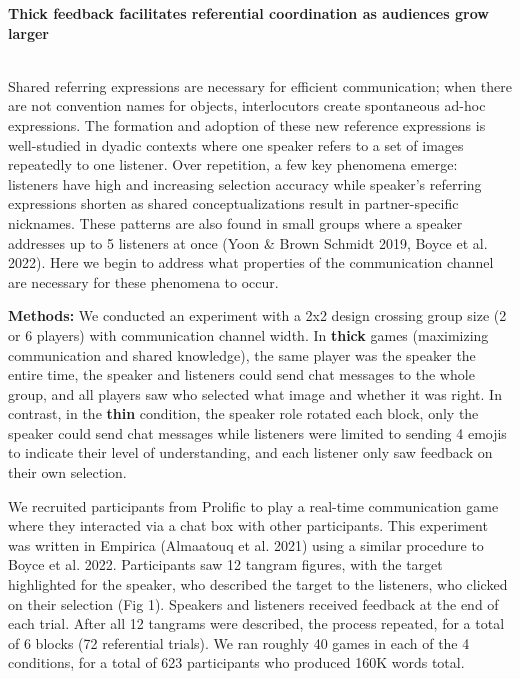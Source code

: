 \documentclass[11pt,a4paper]{article}
\renewcommand{\title}[1]{\textbf{#1}\\}
\newcommand{\authors}[1]{\iftoggle{anonymous}{\phantom{#1}}{#1}\\}
\newcommand{\email}[1]{\iftoggle{anonymous}{\phantom{#1}}{#1}}
\begin{document}


\title{Thick feedback facilitates referential coordination as audiences grow larger}
\authors{Veronica Boyce\textsuperscript{1}, Robert D.  Hawkins\textsuperscript{2}, Noah D. Goodman\textsuperscript{1}, Michael C. Frank\textsuperscript{1}} 
\email{vboyce@stanford.edu;  \textsuperscript{1}Stanford, \textsuperscript{2}Princeton}
\newline
%

Shared referring expressions are necessary for efficient communication; when there are not convention names for objects, interlocutors create spontaneous ad-hoc expressions. The formation and adoption of these new reference expressions is well-studied in dyadic contexts where one speaker refers to a set of images repeatedly to one listener. Over repetition, a few key phenomena emerge: listeners have high and increasing selection accuracy while speaker's referring expressions shorten as shared conceptualizations result in partner-specific nicknames. These patterns are also found in small groups where a speaker addresses up to 5 listeners at once (Yoon \& Brown Schmidt 2019, Boyce et al. 2022). Here we begin to address what properties of the communication channel are necessary for these phenomena to occur.

\textbf{Methods:} We conducted an experiment with a 2x2 design crossing group size (2 or 6 players) with communication channel width. In \textbf{thick} games (maximizing communication and shared knowledge), the same player was the speaker the entire time, the speaker and listeners could send chat messages to the whole group, and all players saw who selected what image and whether it was right. In contrast, in the \textbf{thin} condition, the speaker role rotated each block, only the speaker could send chat messages while listeners were limited to sending 4 emojis to indicate their level of understanding, and each listener only saw feedback on their own selection.

We recruited participants from Prolific to play a real-time communication game where they interacted via a chat box with other participants. This experiment was written in Empirica (Almaatouq et al. 2021) using a similar procedure to Boyce et al. 2022. Participants saw 12 tangram figures, with the target highlighted for the speaker, who described the target to the listeners, who clicked on their selection (Fig 1). Speakers and listeners received feedback at the end of each trial. After all 12 tangrams were described, the process repeated, for a total of 6 blocks (72 referential trials). We ran roughly 40 games in each of the 4 conditions, for a total of 623 participants who produced 160K words total. 
\end{document}
